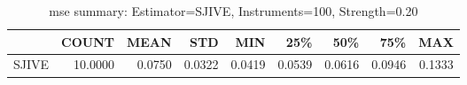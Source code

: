 \begin{table}[ht]
\centering
\caption{mse summary: Estimator=SJIVE, Instruments=100, Strength=0.20}
\begin{tabular}{lrrrrrrrr}
\toprule
 & COUNT & MEAN & STD & MIN & 25\% & 50\% & 75\% & MAX \\
\midrule
SJIVE & 10.0000 & 0.0750 & 0.0322 & 0.0419 & 0.0539 & 0.0616 & 0.0946 & 0.1333 \\
\bottomrule
\end{tabular}
\end{table}
